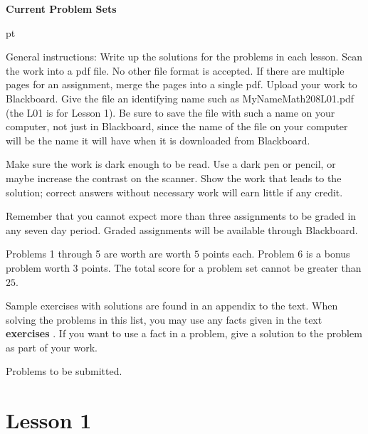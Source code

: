 \documentclass[11pt]{amsart}
\begin{document}
\begin{center}
\bf Current Problem Sets
\end{center}
 pt

General instructions: Write up the solutions for the problems in each lesson. Scan the work
into a pdf file.  No other file format is accepted. If there are multiple pages for an assignment, merge the pages into a single pdf. 
Upload your work to Blackboard.  Give the file an identifying name such as MyNameMath208L01.pdf
(the L01 is for Lesson 1).
Be sure to save the file with such a name on your computer, not just in Blackboard, since the name of the file
on  your computer will be the name it will have when it is downloaded from Blackboard.  

Make sure the work is dark enough to be read. Use a dark pen or pencil, or
maybe increase the contrast on the scanner.  Show the work that leads to the solution; correct answers without necessary work will earn little if any credit.

 Remember that you cannot expect more than three assignments
to be graded in any seven day period. Graded assignments will be available through Blackboard.

Problems 1 through 5 are worth are worth $5$ points each. Problem 6 is a bonus problem worth $3$ points. The total score for a problem set cannot be greater than $25$.

Sample exercises with solutions are found in an appendix to the text. When solving the problems in this list,
you may use any facts given in the text {\bfseries exercises} .
If you want to use a fact in a problem, give a solution to the problem as part of your work. 

\medskip
\begin{center} 
Problems to be submitted.
\end{center}
\medskip



\section{Lesson 1}
\end{document}
